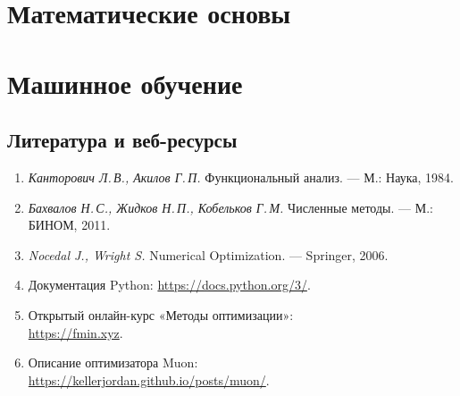 \documentclass[11pt, openany, twoside]{book}
\begin{document}
\part{Математические основы}


\part{Машинное обучение}


\backmatter
\chapter*{Литература и веб-ресурсы}

\noindent\small
\begin{enumerate}\itemsep2pt
  \item \emph{Канторович Л.\,В., Акилов Г.\,П.} Функциональный анализ. ---
        М.: Наука, 1984.
  \item \emph{Бахвалов Н.\,С., Жидков Н.\,П., Кобельков Г.\,М.}
        Численные методы. --- М.: БИНОМ, 2011.
  \item \emph{Nocedal J., Wright S.} Numerical Optimization. ---
        Springer, 2006.
  \item Документация Python: \url{https://docs.python.org/3/}.
  \item Открытый онлайн-курс «Методы оптимизации»:\\
        \url{https://fmin.xyz}.
  \item Описание оптимизатора Muon:\\
        \url{https://kellerjordan.github.io/posts/muon/}.
\end{enumerate}
\end{document}
